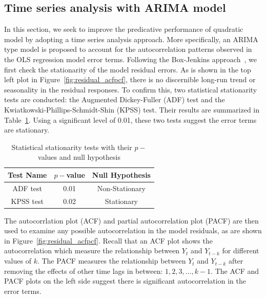 \documentclass [11pt, proquest] {uwthesis}[2015/03/03]
\begin{document}
\subsection{Time series analysis with ARIMA model}

In this section, we seek to improve the predicative performance of quadratic model by adopting a time series analysis approach. More specifically, an ARIMA type model is proposed to account for the autocorrelation patterns observed in the OLS regression model error terms. Following the Box-Jenkins approach~\cite{Jenkins70}, we first check the stationarity of the model residual errors. As is shown in the top left plot in Figure~\ref{fig:residual_acfpcf}, there is no discernible long-run trend or seasonality in the residual responses. To confirm this, two statistical stationarity tests are conducted: the Augmented Dickey-Fuller (ADF) test and the Kwiatkowski-Phillips-Schmidt-Shin (KPSS) test. Their results are summarized in Table~\ref{tbl:stationarytest}. Using a significant level of 0.01, these two tests suggest the error terms are stationary.

\begin{table}
 \centering 
  \label{tbl:stationarytest} 
\small
\begin{tabular}{ c | c | c} 
\hline 
  Test Name & $p-$value & Null Hypothesis \\ 
\hline
  ADF test  & 0.01  &  Non-Stationary \\ 
  KPSS test & 0.02 & Stationary \\ 
\hline 
\end{tabular} 
\caption{Statistical stationarity tests with their $p-$values and null hypothesis} 
\vspace{-.2in}
\end{table} 

The autocorrlation plot (ACF) and partial autocorrelation plot (PACF) are then used to examine any possible autocorrelation in the model residuals, as are shown in Figure~\ref{fig:residual_acfpcf}. Recall that an ACF plot shows the autocorrelation which measure the relationship between $Y_t$ and $Y_{t-k}$ for different values of $k$.  The PACF measures the relationship between $Y_t$ and $Y_{t-k}$ after removing the effects of other time lags in between: $1, 2, 3, \hdots, k-1$. The ACF and PACF plots on the left side suggest there is significant autocorrelation in the error terms.
\end{document}
